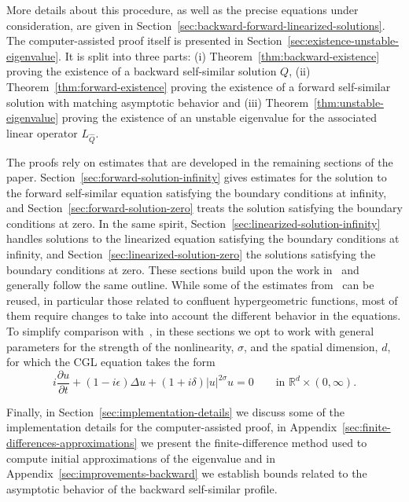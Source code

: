 \documentclass[11pt]{article}
\begin{document}
More details about this procedure, as well as the precise equations
under consideration, are given in
Section~\ref{sec:backward-forward-linearized-solutions}. The
computer-assisted proof itself is presented in
Section~\ref{sec:existence-unstable-eigenvalue}. It is split into
three parts: (i) Theorem~\ref{thm:backward-existence} proving the
existence of a backward self-similar solution \(Q\), (ii)
Theorem~\ref{thm:forward-existence} proving the existence of a forward
self-similar solution with matching asymptotic behavior and (iii)
Theorem~\ref{thm:unstable-eigenvalue} proving the existence of an
unstable eigenvalue for the associated linear operator
\(L_{\hat{Q}}\).

The proofs rely on estimates that are developed in the remaining
sections of the paper. Section~\ref{sec:forward-solution-infinity}
gives estimates for the solution to the forward self-similar equation
satisfying the boundary conditions at infinity, and
Section~\ref{sec:forward-solution-zero} treats the solution satisfying
the boundary conditions at zero. In the same spirit,
Section~\ref{sec:linearized-solution-infinity} handles solutions to
the linearized equation satisfying the boundary conditions at
infinity, and Section~\ref{sec:linearized-solution-zero} the solutions
satisfying the boundary conditions at zero. These sections build upon
the work in~\cite{Dahne2024} and generally follow the same outline.
While some of the estimates from~\cite{Dahne2024} can be reused, in
particular those related to confluent hypergeometric functions, most
of them require changes to take into account the different behavior in
the equations. To simplify comparison with~\cite{Dahne2024}, in these
sections we opt to work with general parameters for the strength of
the nonlinearity, \(\sigma\), and the spatial dimension, \(d\), for
which the CGL equation takes the form
\begin{equation*}
  i \frac{\partial u}{\partial t} + (1 - i\epsilon)\Delta u + (1 + i\delta)|u|^{2\sigma}u = 0 \qquad\text{in }\mathbb{R}^{d} \times (0, \infty).
\end{equation*}

Finally, in Section~\ref{sec:implementation-details} we discuss some
of the implementation details for the computer-assisted proof, in
Appendix~\ref{sec:finite-differences-approximations} we present the
finite-difference method used to compute initial approximations of the
eigenvalue and in Appendix~\ref{sec:improvements-backward} we
establish bounds related
to the asymptotic behavior of the backward self-similar profile.
\end{document}
